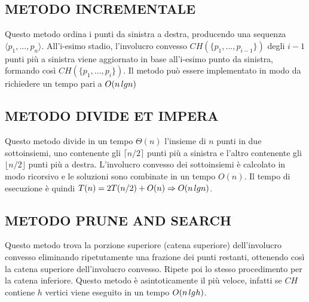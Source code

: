 \documentclass[12pt,a4paper]{report}
\begin{document}
\subsection*{\small{METODO INCREMENTALE}}
Questo metodo ordina i punti da sinistra a destra, producendo una sequenza $\langle p_1, ..., p_n\rangle$. All'i-esimo stadio, l'involucro convesso $CH(\{p_1, ..., p_{i-1}\})$ degli $i - 1$ punti più a sinistra viene aggiornato in base all'i-esimo punto da sinistra, formando così $CH(\{p_1, ..., p_i\})$. Il metodo può essere implementato in modo da richiedere un tempo pari a $O(n\hspace{0.05cm}lgn)$

\subsection*{\small{METODO DIVIDE ET IMPERA}}
Questo metodo divide in un tempo $\Theta(n)$ l'insieme di $n$ punti in due sottoinsiemi, uno contenente gli  $\lceil n/2 \rceil$ punti più a sinistra e l'altro contenente gli $\lfloor n/2 \rfloor$ punti più a destra. L'involucro convesso dei sottoinsiemi è calcolato in modo ricorsivo e le soluzioni sono combinate in un tempo $O(n)$.
Il tempo di esecuzione è quindi $T(n) = 2T(n/2) + O(n) \Rightarrow O(n\hspace{0.05cm}lgn)$.

\subsection*{\small{METODO PRUNE AND SEARCH}}
Questo metodo trova la porzione superiore (catena superiore) dell'involucro convesso eliminando ripetutamente una frazione dei punti restanti, ottenendo così la catena superiore dell'involucro convesso. Ripete poi lo stesso procedimento per la catena inferiore. Questo metodo è asintoticamente il più veloce, infatti se $CH$ contiene $h$ vertici viene eseguito in un tempo $O(n\hspace{0.05cm}lg\hspace{0.01cm}h)$.
\end{document}
